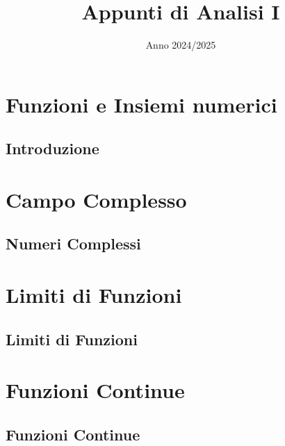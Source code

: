 \documentclass[a4paper,12pt]{report} %
\title{Appunti di Analisi I}
\begin{document}
\date{Anno 2024/2025}


    
    
    \tableofcontents


    \maketitle
    
\chapter{Funzioni e Insiemi numerici}

    \section{Introduzione}

    

\chapter{Campo Complesso}

    \section{Numeri Complessi}

    


\chapter{Limiti di Funzioni}

    \section{Limiti di Funzioni}

    



\chapter{Funzioni Continue}

    \section{Funzioni Continue}
    
\end{document}
